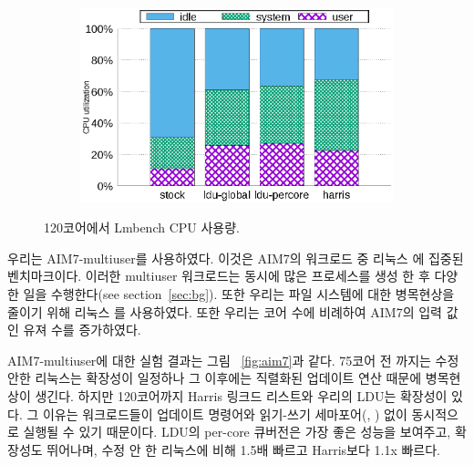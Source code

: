 \begin{figure}[tb]
    \centering
    \begin{subfigure}[b]{1\textwidth}
  \begin{center}
        \includegraphics[scale=0.7]{graph/lmbench_cpuutils.eps}
  \end{center}
    \end{subfigure}
        \centering
    \caption{120코어에서 Lmbench CPU 사용량.}
    \label{fig:utilization_lmbench}
    
\end{figure}



우리는 AIM7-multiuser를 사용하였다. 
이것은 AIM7의 워크로드 중 리눅스 에 집중된 벤치마크이다. 
이러한 multiuser 워크로드는 동시에 많은 프로세스를 생성 한 후 다양한 
일을 수행한다(see section~\ref{sec:bg}). 
또한 우리는 파일 시스템에 대한 병목현상을 줄이기 위해 리눅스 를 사용하였다. 
또한 우리는 코어 수에 비례하여 AIM7의 입력 값인 유져 수를 증가하였다. 
 
AIM7-multiuser에 대한 실험 결과는 그림 ~\ref{fig:aim7}과 같다.
75코어 전 까지는 수정 안한 리눅스는 확장성이 일정하나 그 이후에는 직렬화된 업데이트 
연산 때문에 병목현상이 생긴다. 
하지만 120코어까지 Harris 링크드 리스트와 우리의 LDU는 확장성이 있다. 
그 이유는 워크로드들이 업데이트 명령어와 읽기-쓰기 세마포어(,
) 없이 동시적으로 실행될 수 있기 때문이다.
LDU의 per-core 큐버전은 가장 좋은 성능을 보여주고, 확장성도 뛰어나며, 
수정 안 한 리눅스에 비해 1.5배 빠르고 Harris보다 1.1x 빠르다.

